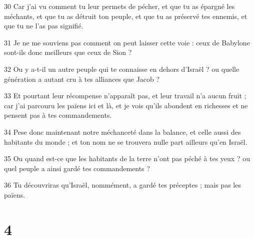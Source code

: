 \par 30 Car j'ai vu comment tu leur permets de pécher, et que tu as épargné les méchants, et que tu as détruit ton peuple, et que tu as préservé tes ennemis, et que tu ne l'as pas signifié.
\par 31 Je ne me souviens pas comment on peut laisser cette voie : ceux de Babylone sont-ils donc meilleurs que ceux de Sion ?
\par 32 Ou y a-t-il un autre peuple qui te connaisse en dehors d'Israël ? ou quelle génération a autant cru à tes alliances que Jacob ?
\par 33 Et pourtant leur récompense n'apparaît pas, et leur travail n'a aucun fruit ; car j'ai parcouru les païens ici et là, et je vois qu'ils abondent en richesses et ne pensent pas à tes commandements.
\par 34 Pese donc maintenant notre méchanceté dans la balance, et celle aussi des habitants du monde ; et ton nom ne se trouvera nulle part ailleurs qu'en Israël.
\par 35 Ou quand est-ce que les habitants de la terre n'ont pas péché à tes yeux ? ou quel peuple a ainsi gardé tes commandements ?
\par 36 Tu découvriras qu'Israël, nommément, a gardé tes préceptes ; mais pas les païens.

\chapter{4}

